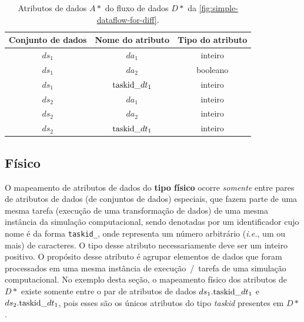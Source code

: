 \begin{table}[htb]
    \centering
    \begin{tabular}{c|c|c}
    \textbf{Conjunto de dados} & \textbf{Nome do atributo} & \textbf{Tipo do atributo} \\ \hline
$ds_1$                        & $da_1$                        & inteiro                 \\
$ds_1$                        & $da_2$                        & booleano                \\
$ds_1$                        & $\textup{taskid\_}dt_1$      & inteiro                 \\ \hline
$ds_2$                        & $da_1$                        & inteiro                 \\
$ds_2$                        & $da_2$                        & inteiro                 \\
$ds_2$                        & $\textup{taskid\_}dt_1$      & inteiro                
    \end{tabular}
    \caption[Atributos de dados do fluxo de dados da \autoref{fig:simple-dataflow-for-diff}]{Atributos de dados \(A\ast\) do fluxo de dados \(D\ast\) da \autoref{fig:simple-dataflow-for-diff}.}
    \label{tab:simple-attributes-for-diff}
\end{table}

\subsection{Físico}%
\label{subsec:rastro-de-proveniencia-do-tipo-fisico}

O mapeamento de atributos de dados do \textbf{tipo físico} ocorre \emph{somente} entre pares de atributos de dados (de conjuntos de dados) especiais, que fazem parte de uma mesma tarefa (execução de uma transformação de dados) de uma mesma instância da simulação computacional, sendo denotadas por um identificador cujo nome é da forma \texttt{taskid\_\ast}, onde \ast{} representa um número arbitrário (\textit{i.e.}, um ou mais) de caracteres. O tipo desse atributo necessariamente deve ser um inteiro positivo. O propósito desse atributo é agrupar elementos de dados que foram processados em uma mesma instância de execução~/~tarefa de uma simulação computacional. No exemplo desta seção, o mapeamento físico dos atributos de \(D\ast\) existe somente entre o par de atributos de dados \(ds_1.\textup{taskid\_}dt_1\) e \(ds_2.\textup{taskid\_}dt_1\), pois esses são os únicos atributos do tipo \textit{taskid} presentes em \(D\ast\).

